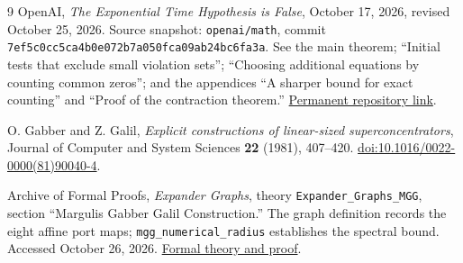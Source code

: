 \documentclass[11pt]{article}
\numberwithin{equation}{section}
\theoremstyle{definition}\newtheorem{definition}[theorem]{Definition}
\theoremstyle{remark}\newtheorem{remark}[theorem]{Remark}
\begin{document}
\begin{thebibliography}{9}
OpenAI, \emph{The Exponential Time Hypothesis is False},
October 17, 2026, revised October 25, 2026.
Source snapshot: \texttt{openai/math}, commit
\texttt{7ef5c0cc5ca4b0e072b7a050fca09ab24bc6fa3a}.
See the main theorem; ``Initial tests that exclude small violation
sets''; ``Choosing additional equations by counting common zeros'';
and the appendices ``A sharper bound for exact counting'' and
``Proof of the contraction theorem.''
\href{https://github.com/openai/math/tree/7ef5c0cc5ca4b0e072b7a050fca09ab24bc6fa3a/preprints/The-Exponential-Time-Hypothesis-is-False-October-25-2026}{Permanent repository link}.

O. Gabber and Z. Galil,
\emph{Explicit constructions of linear-sized superconcentrators},
Journal of Computer and System Sciences \textbf{22} (1981),
407--420.
\href{https://doi.org/10.1016/0022-0000(81)90040-4}{doi:10.1016/0022-0000(81)90040-4}.

Archive of Formal Proofs,
\emph{Expander Graphs}, theory \texttt{Expander\_Graphs\_MGG},
section ``Margulis Gabber Galil Construction.''
The graph definition records the eight affine port maps;
\texttt{mgg\_numerical\_radius} establishes the spectral bound.
Accessed October 26, 2026.
\href{https://isa-afp.org/browser_info/current/AFP/Expander_Graphs/Expander_Graphs_MGG.html}{Formal theory and proof}.
\end{thebibliography}
\end{document}
